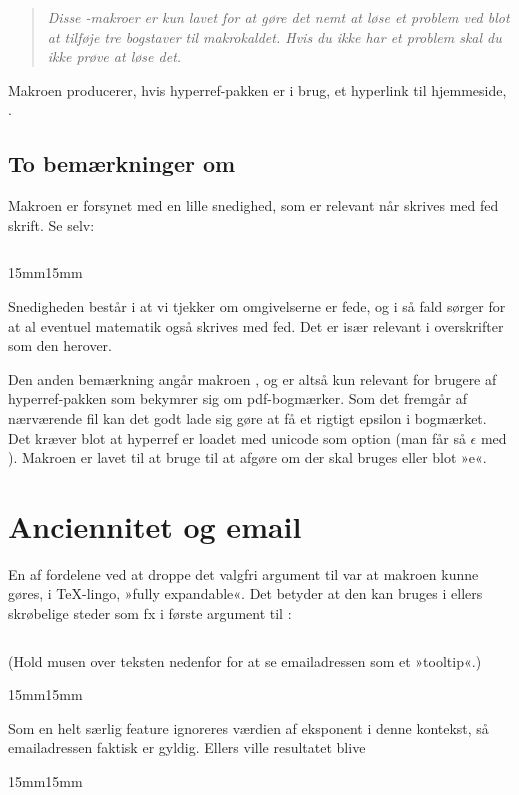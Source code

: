 \documentclass[a4paper,article,oneside,danish]{memoir}
\newcommand{\pakkenavn}[1]{\textsf{#1}}
\newcommand*{\optionname}[1]{\textcolor{option}{#1}}
\newenvironment{resultat}{%
  \begin{adjustwidth}{15mm}{15mm}%
    \begin{qshade}%
    }{%
    \end{qshade}%
  \end{adjustwidth}}
\begin{document}
\begin{quote}
  \itshape  Disse -makroer er kun lavet for at gøre det nemt at løse
  et problem ved blot at tilføje tre bogstaver til makrokaldet. Hvis
  du ikke har et problem skal du ikke prøve at løse det.
\end{quote}

Makroen  producerer, hvis \pakkenavn{hyperref}-pakken er i
brug, et hyperlink til \TKETs hjemmeside, \TKurl.

\subsection{To bemærkninger om \RemToRpdf}
\label{sec:bemarkn-om-remt}

Makroen  er forsynet med en lille snedighed, som er
relevant når \RemToR skrives med fed skrift. Se selv:
\inputminted{latex}{eksempel-RemToR.tex}

\begin{resultat}

\end{resultat}

Snedigheden består i at vi tjekker om omgivelserne er fede, og i så
fald sørger for at al eventuel matematik også skrives med fed. Det er
især relevant i overskrifter som den herover.

Den anden bemærkning angår makroen , og er altså kun
relevant for brugere af \pakkenavn{hyperref}-pakken som bekymrer sig
om pdf-bogmærker. Som det fremgår af nærværende fil kan det godt lade
sig gøre at få et rigtigt epsilon i bogmærket. Det kræver blot at
\pakkenavn{hyperref} er loadet med \optionname{unicode} som option
(man får så $\epsilon$ med ). Makroen 
er lavet til at bruge  til at afgøre om der skal
bruges  eller blot »e«.

\section{Anciennitet og email}
\label{sec:anciennitet-og-email}

En af fordelene ved at droppe det valgfri argument til 
var at makroen kunne gøres, i \TeX-lingo, »fully expandable«. Det
betyder at den kan bruges i ellers skrøbelige steder som fx i første
argument til :
\inputminted{latex}{eksempel-href.tex}
(Hold musen over teksten nedenfor for at se emailadressen som et »tooltip«.)
\begin{resultat}

\end{resultat}
Som en helt særlig feature ignoreres værdien af \optionname{eksponent}
i denne kontekst, så emailadressen faktisk er gyldig. Ellers ville
resultatet blive
\begin{resultat}

\end{resultat}
\end{document}
